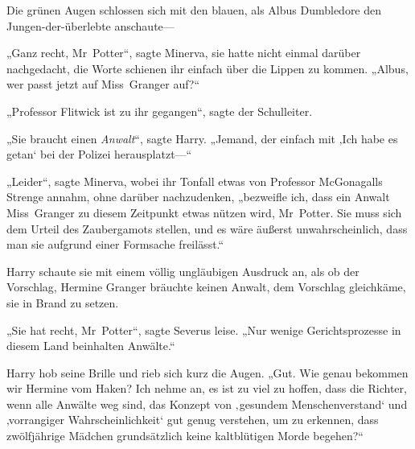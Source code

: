 Die grünen Augen schlossen sich mit den blauen, als Albus Dumbledore den Jungen-der-überlebte anschaute—

„Ganz recht, Mr~Potter“, sagte Minerva, sie hatte nicht einmal darüber nachgedacht, die Worte schienen ihr einfach über die Lippen zu kommen.
„Albus, wer passt jetzt auf Miss~Granger auf?“

„Professor Flitwick ist zu ihr gegangen“, sagte der Schulleiter.

„Sie braucht einen \emph{Anwalt}“, sagte Harry.
„Jemand, der einfach mit ‚Ich habe es getan‘ bei der Polizei herausplatzt—“

„Leider“, sagte Minerva, wobei ihr Tonfall etwas von Professor McGonagalls Strenge annahm, ohne darüber nachzudenken, „bezweifle ich, dass ein Anwalt Miss~Granger zu diesem Zeitpunkt etwas nützen wird, Mr~Potter. Sie muss sich dem Urteil des Zaubergamots stellen, und es wäre äußerst unwahrscheinlich, dass man sie aufgrund einer Formsache freilässt.“

Harry schaute sie mit einem völlig ungläubigen Ausdruck an, als ob der Vorschlag, Hermine Granger bräuchte keinen Anwalt, dem Vorschlag gleichkäme, sie in Brand zu setzen.

„Sie hat recht, Mr~Potter“, sagte Severus leise.
„Nur wenige Gerichtsprozesse in diesem Land beinhalten Anwälte.“

Harry hob seine Brille und rieb sich kurz die Augen.
„Gut. Wie genau bekommen wir Hermine vom Haken? Ich nehme an, es ist zu viel zu hoffen, dass die Richter, wenn alle Anwälte weg sind, das Konzept von ‚gesundem Menschenverstand‘ und ‚vorrangiger Wahrscheinlichkeit‘ gut genug verstehen, um zu erkennen, dass zwölfjährige Mädchen grundsätzlich keine kaltblütigen Morde begehen?“

